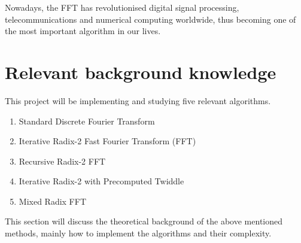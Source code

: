 \documentclass{article}
\begin{document}
Nowadays, the FFT has revolutionised digital signal processing, telecommunications and numerical computing worldwide, thus becoming one of the most important algorithm in our lives.

\section{Relevant background knowledge}
This project will be implementing and studying five relevant algorithms. 
\begin{enumerate}
  \item Standard Discrete Fourier Transform
  \item Iterative Radix-2 Fast Fourier Transform (FFT)
  \item Recursive Radix-2 FFT
  \item Iterative Radix-2 with Precomputed Twiddle
  \item Mixed Radix FFT
\end{enumerate}
This section will discuss the theoretical background of the above mentioned methods, mainly how to implement the algorithms and their complexity.
\end{document}
